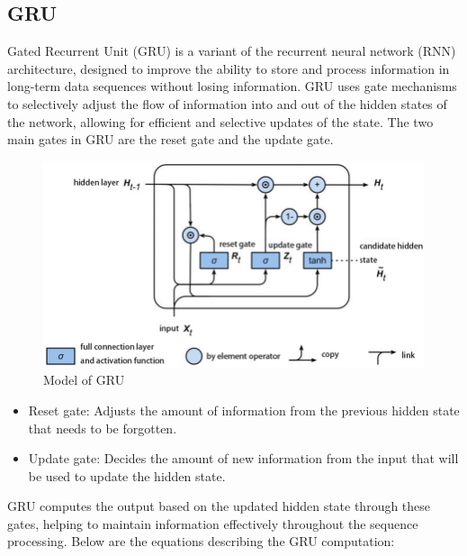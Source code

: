 \documentclass{ieeeojies}
\begin{document}
\subsection{GRU}
	Gated Recurrent Unit (GRU) is a variant of the recurrent neural network (RNN) architecture, designed to improve the ability to store and process information in long-term data sequences without losing information. GRU uses gate mechanisms to selectively adjust the flow of information into and out of the hidden states of the network, allowing for efficient and selective updates of the state. The two main gates in GRU are the reset gate and the update gate.
\begin{figure}[H]
  \centering
  \begin{minipage}{0.8\linewidth}
    \centering
    \includegraphics[width=\linewidth]{bibliography/gru_fig.png}
    \caption{Model of GRU}
    \label{fig10}
  \end{minipage}
\end{figure}
	\begin{itemize}
		\item Reset gate: Adjusts the amount of information from the previous hidden state that needs to be forgotten.
		\item Update gate: Decides the amount of new information from the input that will be used to update the hidden state.
	\end{itemize}
	GRU computes the output based on the updated hidden state through these gates, helping to maintain information effectively throughout the sequence processing.
	Below are the equations describing the GRU computation:
\end{document}
